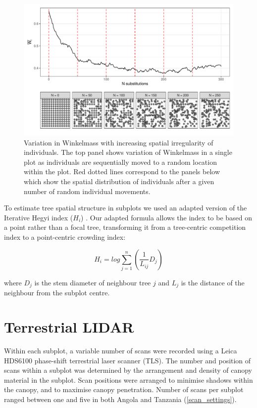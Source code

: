 \documentclass[11pt,a4paper]{article}
\begin{document}
\begin{figure}[H]
\centering
	\includegraphics[width=\textwidth]{wi_diagram}
	\caption{Variation in Winkelmass with increasing spatial irregularity of individuals. The top panel shows variation of Winkelmass in a single plot as individuals are sequentially moved to a random location within the plot. Red dotted lines correspond to the panels below which show the spatial distribution of individuals after a given number of random individual movements.}
	\label{wi_diagram}
\end{figure}

To estimate tree spatial structure in subplots we used an adapted version of the Iterative Hegyi index ($H_{i}$) \citep{Hegyi1974}. Our adapted formula allows the index to be based on a point rather than a focal tree, transforming it from a tree-centric competition index to a point-centric crowding index:

\begin{equation}
	H_{i} = log\sum_{j=1}^{n} (\frac{1}{L_{ij}} D_{j})
\end{equation}

where $D_{j}$ is the stem diameter of neighbour tree $j$ and $L_{j}$ is the distance of the neighbour from the subplot centre.


\section{Terrestrial LIDAR}

Within each subplot, a variable number of scans were recorded using a Leica HDS6100 phase-shift terrestrial laser scanner (TLS). The number and position of scans within a subplot was determined by the arrangement and density of canopy material in the subplot. Scan positions were arranged to minimise shadows within the canopy, and to maximise canopy penetration. Number of scans per subplot ranged between one and five in both Angola and Tanzania (\autoref{scan_settings}).
\end{document}
